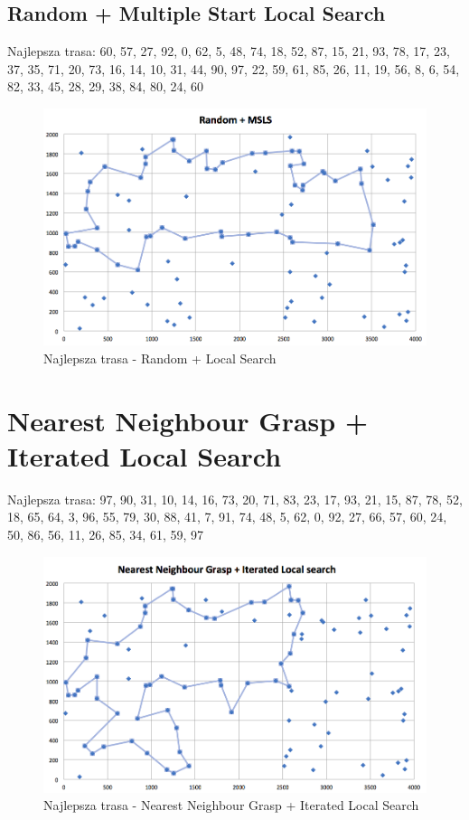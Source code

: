 \documentclass[a4paper 10pt]{article}
\begin{document}
\subsection{Random + Multiple Start Local Search}
Najlepsza trasa: 60, 57, 27, 92, 0, 62, 5, 48, 74, 18, 52, 87, 15, 21, 93, 78, 17, 23, 37, 35, 71, 20, 73, 16, 14, 10, 31, 44, 90, 97, 22, 59, 61, 85, 26, 11, 19, 56, 8, 6, 54, 82, 33, 45, 28, 29, 38, 84, 80, 24, 60 
\begin{figure} [H]
\centering
\includegraphics[angle=0,width = 1\textwidth, height=!]{images/Random_MSLS.png}
\caption{Najlepsza trasa - Random + Local Search}
\label{Rys. NN}
\end{figure}

\newpage
\section{Nearest Neighbour Grasp + Iterated Local Search}
Najlepsza trasa: 97, 90, 31, 10, 14, 16, 73, 20, 71, 83, 23, 17, 93, 21, 15, 87, 78, 52, 18, 65, 64, 3, 96, 55, 79, 30, 88, 41, 7, 91, 74, 48, 5, 62, 0, 92, 27, 66, 57, 60, 24, 50, 86, 56, 11, 26, 85, 34, 61, 59, 97 
\begin{figure} [H]
\centering
\includegraphics[angle=0,width = 1\textwidth, height=!]{images/NNG_ILS.png}
\caption{Najlepsza trasa - Nearest Neighbour Grasp + Iterated Local Search}
\label{Rys. NN}
\end{figure}
\end{document}
